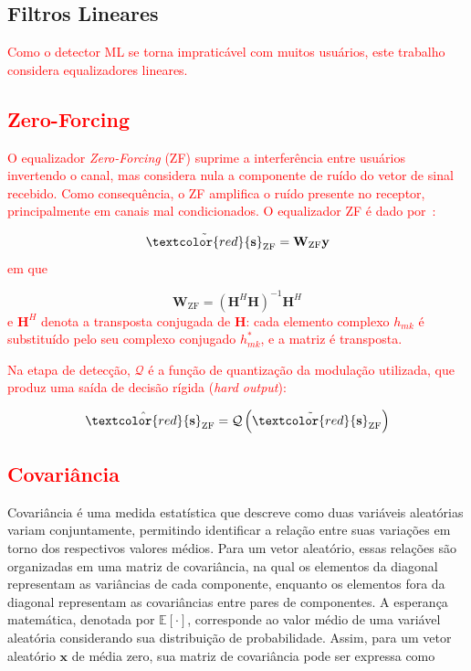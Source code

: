\subsection{Filtros Lineares}

\textcolor{red}{Como o detector ML se torna impraticável com muitos usuários, este trabalho considera equalizadores lineares.}

\subsection{\texorpdfstring{\textcolor{red}{Zero-Forcing}}{Zero-Forcing}}

\textcolor{red}{O equalizador \textit{Zero-Forcing} (ZF) suprime a interferência entre usuários invertendo o canal, mas considera nula a componente de ruído do vetor de sinal recebido. Como consequência, o ZF amplifica o ruído presente no receptor, principalmente em canais mal condicionados. O equalizador ZF é dado por~\cite{zero-forcing}:}

\begin{equation}
\tilde{\textcolor{red}{\mathbf{s}}}_\text{ZF} =
\mathbf{W}_\text{ZF}\mathbf{y}
\label{eq:zf_estimate}
\end{equation}
\textcolor{red}{em que}

\begin{equation}
\mathbf{W}_\text{ZF}=
\left(\mathbf{H}^H\mathbf{H}\right)^{-1}\mathbf{H}^H
\label{eq:zf_filter}
\end{equation}
\textcolor{red}{e $\mathbf{H}^H$ denota a transposta conjugada de $\mathbf{H}$: cada elemento complexo $h_{mk}$ é substituído pelo seu complexo conjugado $h_{mk}^*$, e a matriz é transposta.}


\textcolor{red}{Na etapa de detecção, $\mathcal{Q}$ é a função de quantização da modulação utilizada, que produz uma saída de decisão rígida (\textit{hard output}):}

\begin{equation}
\hat{\textcolor{red}{\mathbf{s}}}_\text{ZF}=
\mathcal{Q}\left(\tilde{\textcolor{red}{\mathbf{s}}}_\text{ZF}\right)
\label{eq:zf_detection}
\end{equation}


\subsection{\texorpdfstring{\textcolor{red}{Covariância}}{Covariância}}

Covariância é uma medida estatística que descreve como duas variáveis aleatórias variam conjuntamente, permitindo identificar a relação entre suas variações em torno dos respectivos valores médios. Para um vetor aleatório, essas relações são organizadas em uma matriz de covariância, na qual os elementos da diagonal representam as variâncias de cada componente, enquanto os elementos fora da diagonal representam as covariâncias entre pares de componentes. A esperança matemática, denotada por $\mathbb{E}[\cdot]$, corresponde ao valor médio de uma variável aleatória considerando sua distribuição de probabilidade. Assim, para um vetor aleatório $\mathbf{x}$ de média zero, sua matriz de covariância pode ser expressa como


